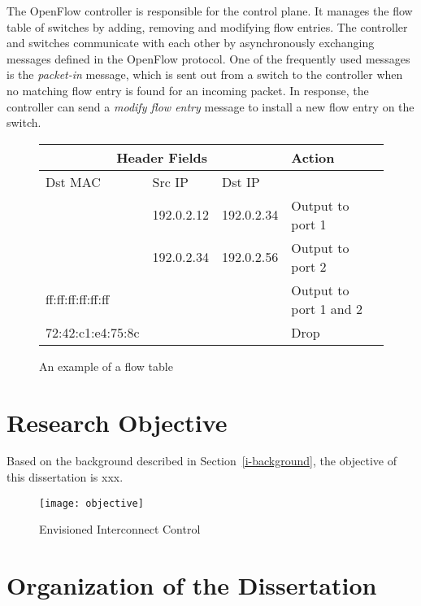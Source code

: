 The OpenFlow controller is responsible for the control plane. It manages
the flow table of switches by adding, removing and modifying flow
entries. The controller and switches communicate with each other by
asynchronously exchanging messages defined in the OpenFlow protocol. One
of the frequently used messages is the \emph{packet-in} message, which
is sent out from a switch to the controller when no matching flow entry
is found for an incoming packet. In response, the controller can send a
\emph{modify flow entry} message to install a new flow entry on the
switch.

\begin{figure}
    \centering
    \begin{tabular}{lllll}
        \toprule
        \multicolumn{3}{c}{Header Fields}            &  Action                  \\ \midrule
        Dst MAC           & Src IP     & Dst IP      &                          \\ \midrule
                          & 192.0.2.12 & 192.0.2.34  & Output to port 1         \\
                          & 192.0.2.34 & 192.0.2.56  & Output to port 2         \\
        ff:ff:ff:ff:ff:ff &            &             & Output to port 1 and 2   \\
        72:42:c1:e4:75:8c &            &             & Drop                     \\
        \bottomrule
    \end{tabular}
    \caption{An example of a flow table}%
    \label{tbl:flow-table}
\end{figure}

\section{Research Objective}

Based on the background described in Section~\ref{i-background}, the objective
of this dissertation is xxx.

\begin{figure}
    \centering
    \texttt{[image: objective]}
    \caption{Envisioned Interconnect Control}%
    \label{fig:objective}
\end{figure}



\section{Organization of the Dissertation}

